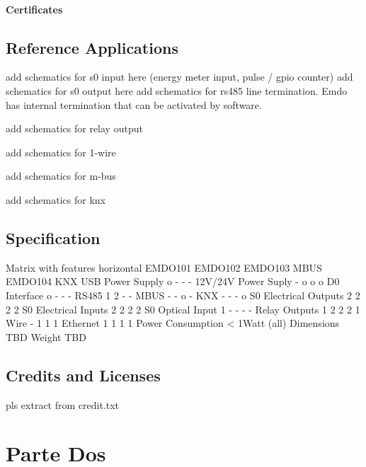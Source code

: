 \documentclass[11pt,fleqn]{book} %
\numberwithin{equation}{section} %
\numberwithin{figure}{section} %
\numberwithin{table}{section} %
\begin{document}
\subsection*{Certificates}

\chapter{Reference Applications}
add schematics for s0 input here (energy meter input, pulse / gpio counter)
\label{fig:s0_input_application}
add schematics for s0 output here
\label{fig:s0_output_application}
add schematics for rs485 line termination. Emdo has internal termination that can be activated by software.
\label{fig:rs485_application}

add schematics for relay output
\label{fig:relay_application}

add schematics for 1-wire
\label{1wire_application}

add schematics for m-bus
\label{mbus_application}

add schematics for knx
\label{knx_application}


\chapter{Specification}
Matrix with features
horizontal	EMDO101	EMDO102	EMDO103 MBUS	EMDO104 KNX
USB Power Supply o - - -
12V/24V Power Suply - o o o
D0 Interface o - - -
RS485 1 2 - -
MBUS - - o -
KNX - - - o
S0 Electrical Outputs 2 2 2 2 
S0 Electrical Inputs 2 2 2 2
S0 Optical Input 1 - - - -
Relay Outputs 1 2 2 2
1 Wire - 1 1 1 
Ethernet 1 1 1 1
Power Consumption < 1Watt (all)
Dimensions TBD
Weight TBD
\chapter{Credits and Licenses}
pls extract from credit.txt






\part{Parte Dos}
\end{document}
